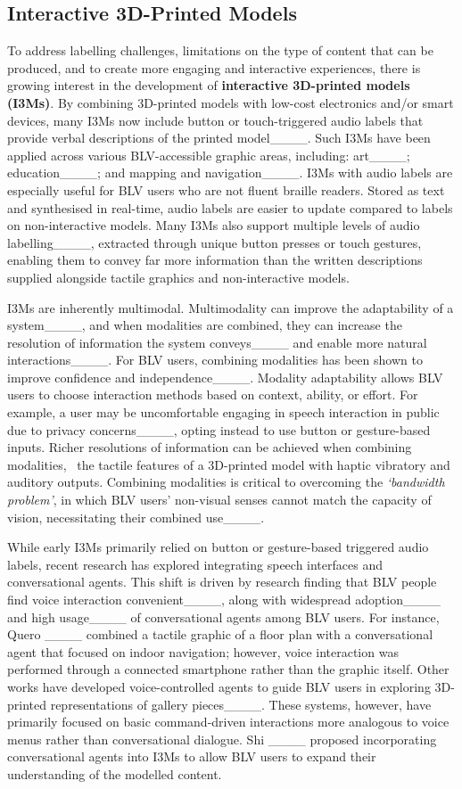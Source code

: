 \subsection{Interactive 3D-Printed Models}
To address labelling challenges, limitations on the type of content that can be produced, and to create more engaging and interactive experiences, there is growing interest in the development of \textbf{interactive 3D-printed models (I3Ms)}. By combining 3D-printed models with low-cost electronics and/or smart devices, many I3Ms now include button or touch-triggered audio labels that provide verbal descriptions of the printed model____. Such I3Ms have been applied across various BLV-accessible graphic areas, including: art____; education____; and mapping and navigation____. I3Ms with audio labels are especially useful for BLV users who are not fluent braille readers. Stored as text and synthesised in real-time, audio labels are easier to update compared to labels on non-interactive models. Many I3Ms also support multiple levels of audio labelling____, extracted through unique button presses or touch gestures, enabling them to convey far more information than the written descriptions supplied alongside tactile graphics and non-interactive models.

I3Ms are inherently multimodal. Multimodality can improve the adaptability of a system____, and when modalities are combined, they can increase the resolution of information the system conveys____ and enable more natural interactions____. For BLV users, combining modalities has been shown to improve confidence and independence____. Modality adaptability allows BLV users to choose interaction methods based on context, ability, or effort. For example, a user may be uncomfortable engaging in speech interaction in public due to privacy concerns____, opting instead to use button or gesture-based inputs. Richer resolutions of information can be achieved when combining modalities, \eg\, the tactile features of a 3D-printed model with haptic vibratory and auditory outputs. Combining modalities is critical to overcoming the \textit{`bandwidth problem'}, in which BLV users' non-visual senses cannot match the capacity of vision, necessitating their combined use____.

While early I3Ms primarily relied on button or gesture-based triggered audio labels, recent research has explored integrating speech interfaces and conversational agents. This shift is driven by research finding that BLV people find voice interaction convenient____, along with widespread adoption____ and high usage____ of conversational agents among BLV users. For instance, Quero \etal____ combined a tactile graphic of a floor plan with a conversational agent that focused on indoor navigation; however, voice interaction was performed through a connected smartphone rather than the graphic itself. Other works have developed voice-controlled agents to guide BLV users in exploring 3D-printed representations of gallery pieces____. These systems, however, have primarily focused on basic command-driven interactions more analogous to voice menus rather than conversational dialogue. Shi \etal____ proposed incorporating conversational agents into I3Ms to allow BLV users to expand their understanding of the modelled content.

